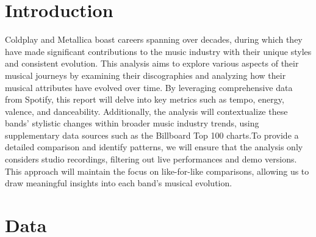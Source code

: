 \documentclass[11pt,preprint, authoryear]{elsarticle}
\numberwithin{equation}{section}
\numberwithin{figure}{section}
\numberwithin{table}{section}
\begin{document}

\headsep 35pt %




\section{\texorpdfstring{Introduction
\label{Introduction}}{Introduction }}\label{introduction}

Coldplay and Metallica boast careers spanning over decades, during which
they have made significant contributions to the music industry with
their unique styles and consistent evolution. This analysis aims to
explore various aspects of their musical journeys by examining their
discographies and analyzing how their musical attributes have evolved
over time. By leveraging comprehensive data from Spotify, this report
will delve into key metrics such as tempo, energy, valence, and
danceability. Additionally, the analysis will contextualize these bands'
stylistic changes within broader music industry trends, using
supplementary data sources such as the Billboard Top 100 charts.To
provide a detailed comparison and identify patterns, we will ensure that
the analysis only considers studio recordings, filtering out live
performances and demo versions. This approach will maintain the focus on
like-for-like comparisons, allowing us to draw meaningful insights into
each band's musical evolution.

\section*{Data}\label{data}
\end{document}
